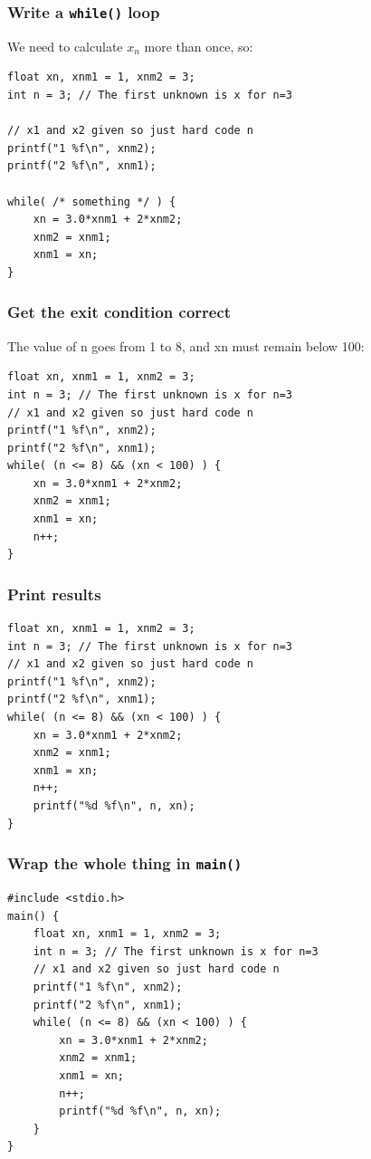 \documentclass[14pt]{beamer}
\begin{document}
\begin{frame}[fragile]
\frametitle{Write a \texttt{while()} loop}
We need to calculate $x_n$ more than once, so:
\begin{lstlisting}[style=CStyle]
float xn, xnm1 = 1, xnm2 = 3;
int n = 3; // The first unknown is x for n=3

// x1 and x2 given so just hard code n
printf("1 %f\n", xnm2);
printf("2 %f\n", xnm1);

while( /* something */ ) {
	xn = 3.0*xnm1 + 2*xnm2;
	xnm2 = xnm1;
	xnm1 = xn;
}
\end{lstlisting}
\end{frame}

\begin{frame}[fragile]
\frametitle{Get the exit condition correct}
The value of n goes from 1 to 8, and xn must remain below 100:
\begin{lstlisting}[style=CStyle]
float xn, xnm1 = 1, xnm2 = 3;
int n = 3; // The first unknown is x for n=3
// x1 and x2 given so just hard code n
printf("1 %f\n", xnm2);
printf("2 %f\n", xnm1);
while( (n <= 8) && (xn < 100) ) {
	xn = 3.0*xnm1 + 2*xnm2;
	xnm2 = xnm1;
	xnm1 = xn;
	n++;
}
\end{lstlisting}
\end{frame}

\begin{frame}[fragile]
\frametitle{Print results}
\begin{lstlisting}[style=CStyle]
float xn, xnm1 = 1, xnm2 = 3;
int n = 3; // The first unknown is x for n=3
// x1 and x2 given so just hard code n
printf("1 %f\n", xnm2);
printf("2 %f\n", xnm1);
while( (n <= 8) && (xn < 100) ) {
	xn = 3.0*xnm1 + 2*xnm2;
	xnm2 = xnm1;
	xnm1 = xn;
	n++;
	printf("%d %f\n", n, xn);
}
\end{lstlisting}
\end{frame}

\begin{frame}[fragile]
\frametitle{Wrap the whole thing in \texttt{main()}}
\begin{lstlisting}[style=CStyle]
#include <stdio.h>
main() {
	float xn, xnm1 = 1, xnm2 = 3;
	int n = 3; // The first unknown is x for n=3
	// x1 and x2 given so just hard code n
	printf("1 %f\n", xnm2);
	printf("2 %f\n", xnm1);
	while( (n <= 8) && (xn < 100) ) {
		xn = 3.0*xnm1 + 2*xnm2;
		xnm2 = xnm1;
		xnm1 = xn;
		n++;
		printf("%d %f\n", n, xn);
	}
}
\end{lstlisting}
\end{frame}
\end{document}
